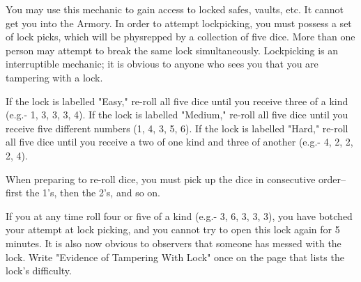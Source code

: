 \documentclass[green]{guildcamp3}
\begin{document}
	
	\name{\gLockpicking{}}
	

	
	You may use this mechanic to gain access to locked safes, vaults, etc. It cannot get you into the Armory.
	In order to attempt lockpicking, you must possess a set of lock picks, which will be physrepped by a collection of five dice. More than one person may attempt to break the same lock simultaneously. Lockpicking is an interruptible mechanic; it is obvious to anyone who sees you that you are tampering with a lock.
	
	
	\begin{enum}[Directions]
		\item If the lock is labelled "Easy," re-roll all five dice until you receive three of a kind (e.g.- 1, 3, 3, 3, 4). If the lock is labelled "Medium," re-roll all five dice until you receive five different numbers (1, 4, 3, 5, 6). If the lock is labelled "Hard," re-roll all five dice until you receive a two of one kind and three of another (e.g.- 4, 2, 2, 2, 4).
		\item When preparing to re-roll dice, you must pick up the dice in consecutive order-- first the 1's, then the 2's, and so on.
		\item If you at any time roll four or five of a kind (e.g.- 3, 6, 3, 3, 3), you have botched your attempt at lock picking, and you cannot try to open this lock again for 5 minutes. It is also now obvious to observers that someone has messed with the lock. Write "Evidence of Tampering With Lock" once on the page that lists the lock's difficulty.
		\end{enum}
	
	
\end{document}
